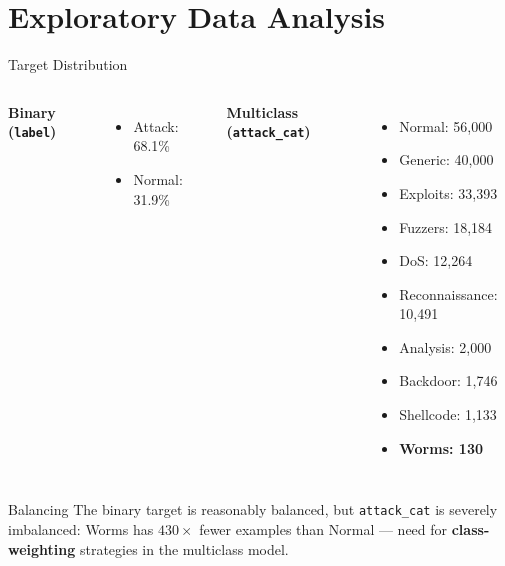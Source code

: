 \documentclass{beamer}
\begin{document}
\section{Exploratory Data Analysis}

\begin{frame}{Target Distribution}
  \begin{columns}
    \textbf{Binary (\texttt{label})}
    \begin{itemize}
      \item Attack: 68.1\%
      \item Normal: 31.9\%
    \end{itemize}

    \textbf{Multiclass (\texttt{attack\_cat})}
    \begin{itemize}
      \footnotesize
      \item Normal: 56,000
      \item Generic: 40,000
      \item Exploits: 33,393
      \item Fuzzers: 18,184
      \item DoS: 12,264
      \item Reconnaissance: 10,491
      \item Analysis: 2,000
      \item Backdoor: 1,746
      \item Shellcode: 1,133
      \item \textbf{Worms: 130}
    \end{itemize}
  \end{columns}
  \vspace{0.3cm}
  \begin{alertblock}{Balancing}
    The binary target is reasonably balanced, but \texttt{attack\_cat} is
    severely imbalanced: Worms has $430\times$ fewer examples than Normal —
    need for \textbf{class-weighting} strategies in the multiclass model.
  \end{alertblock}
\end{frame}
\end{document}

